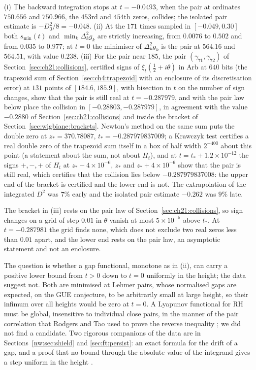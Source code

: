 \begin{proposition}\label{cp:prop:gas}
(i) The backward integration stops at $t=-0.0493$, when the pair at ordinates $750.656$ and $750.966$, the $453$rd and $454$th zeros, collides; the isolated pair estimate is $-D_0^2/8=-0.048$. (ii) At the $171$ times sampled in $[-0.049,0.30]$ both $s_{\min}(t)$ and $\min_k\Delta_k^2g_k$ are strictly increasing, from $0.0076$ to $0.502$ and from $0.035$ to $0.977$; at $t=0$ the minimiser of $\Delta_k^2g_k$ is the pair at $564.16$ and $564.51$, with value $0.238$. (iii) For the pair near $185$, the pair $(\gamma_{71},\gamma_{72})$ of Section~\ref{sec:ch21:collisions}, certified signs of $\xi_t(\frac12+i\theta)$ in Arb at $640$ bits (the trapezoid sum of Section~\ref{sec:ch4:trapezoid} with an enclosure of its discretisation error) at $131$ points of $[184.6,185.9]$, with bisection in $t$ on the number of sign changes, show that the pair is still real at $t=-0.287979$, and with the pair law below place the collision in $[-0.28803,-0.287979]$, in agreement with the value $-0.2880$ of Section~\ref{sec:ch21:collisions} and inside the bracket of Section~\ref{sec:wigbiane:brackets}. Newton's method on the same sum puts the double zero at $z_*=370.78087$, $t_*=-0.287979837009$; a Krawczyk test certifies a real double zero of the trapezoid sum itself in a box of half width $2^{-400}$ about this point (a statement about the sum, not about $H_t$), and at $t=t_*+1.2\times10^{-12}$ the signs $+,-,+$ of $H_t$ at $z_*-4\times10^{-6}$, $z_*$ and $z_*+4\times10^{-6}$ show that the pair is still real, which certifies that the collision lies below $-0.287979837008$: the upper end of the bracket is certified and the lower end is not. The extrapolation of the integrated $D^2$ was $7\%$ early and the isolated pair estimate $-0.262$ was $9\%$ late.
\end{proposition}

The bracket in (iii) rests on the pair law of Section~\ref{sec:ch21:collisions}, so sign changes on a grid of step $0.01$ in $\theta$ vanish at most $5\times10^{-5}$ above $t_*$. At $t=-0.287981$ the grid finds none, which does not exclude two real zeros less than $0.01$ apart, and the lower end rests on the pair law, an asymptotic statement and not an enclosure.

The question is whether a gap functional, monotone as in (ii), can carry a positive lower bound from $t>0$ down to $t=0$ uniformly in the height; the data suggest not. Both are minimised at Lehmer pairs, whose normalised gaps are expected, on the GUE conjecture, to be arbitrarily small at large height, so their infimum over all heights would be zero at $t=0$. A Lyapunov functional for RH must be global, insensitive to individual close pairs, in the manner of the pair correlation that Rodgers and Tao used to prove the reverse inequality \cite{RodgersTao}; we did not find a candidate. Two rigorous companions of the data are in Sections~\ref{nw:sec:shield} and \ref{sec:ft:persist}: an exact formula for the drift of a gap, and a proof that no bound through the absolute value of the integrand gives a step uniform in the height \cite{Newton26}.

